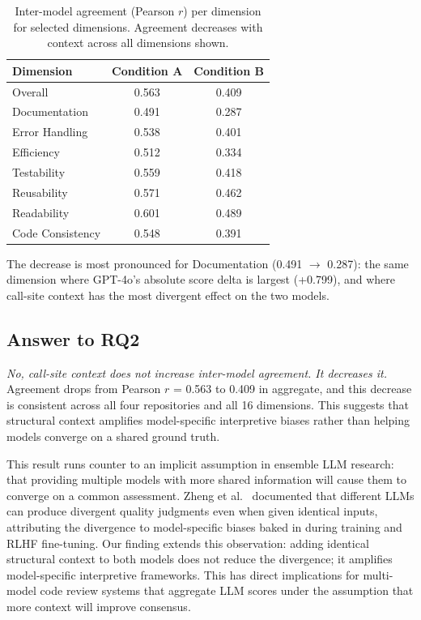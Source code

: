 \documentclass[12pt]{report}
\begin{document}
\begin{table}[htbp]
\centering
\begin{tabular}{lcc}
\toprule
\textbf{Dimension} & \textbf{Condition A} & \textbf{Condition B} \\
\midrule
Overall                & 0.563 & 0.409 \\
Documentation          & 0.491 & 0.287 \\
Error Handling         & 0.538 & 0.401 \\
Efficiency             & 0.512 & 0.334 \\
Testability            & 0.559 & 0.418 \\
Reusability            & 0.571 & 0.462 \\
Readability            & 0.601 & 0.489 \\
Code Consistency       & 0.548 & 0.391 \\
\bottomrule
\end{tabular}
\caption{Inter-model agreement (Pearson $r$) per dimension for selected dimensions. Agreement decreases with context across all dimensions shown.}
\label{tab:agreement_dim}
\end{table}

The decrease is most pronounced for Documentation (0.491 $\to$ 0.287): the same dimension where GPT-4o's absolute score delta is largest (+0.799), and where call-site context has the most divergent effect on the two models.

\subsection{Answer to RQ2}

\textit{No, call-site context does not increase inter-model agreement. It decreases it.} Agreement drops from Pearson $r$ = 0.563 to 0.409 in aggregate, and this decrease is consistent across all four repositories and all 16 dimensions. This suggests that structural context amplifies model-specific interpretive biases rather than helping models converge on a shared ground truth.

This result runs counter to an implicit assumption in ensemble LLM research: that providing multiple models with more shared information will cause them to converge on a common assessment. Zheng et al.~\cite{zheng2023judging} documented that different LLMs can produce divergent quality judgments even when given identical inputs, attributing the divergence to model-specific biases baked in during training and RLHF fine-tuning. Our finding extends this observation: adding identical structural context to both models does not reduce the divergence; it amplifies model-specific interpretive frameworks. This has direct implications for multi-model code review systems that aggregate LLM scores under the assumption that more context will improve consensus.
\end{document}
